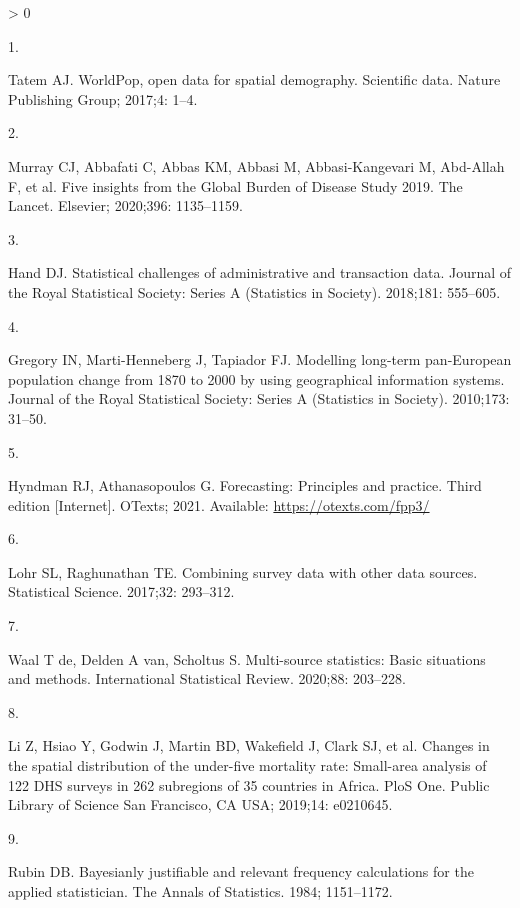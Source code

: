 \documentclass[10pt,letterpaper]{article}
\newlength{\csllabelwidth}
\newlength{\cslhangindent}
\newenvironment{CSLReferences}[2] %
 {%
  \setlength{\parindent}{0pt}
  \ifodd #1 \everypar{\setlength{\hangindent}{\cslhangindent}}\ignorespaces\fi
  \ifnum #2 > 0
  \setlength{\parskip}{#2\baselineskip}
  \fi
 }%
 {}
\newcommand{\CSLLeftMargin}[1]{\parbox[t]{\csllabelwidth}{#1}}
\newcommand{\CSLRightInline}[1]{\parbox[t]{\linewidth - \csllabelwidth}{#1}\break}
\begin{document}
\hypertarget{refs}{}
\begin{CSLReferences}{0}{0}
\leavevmode\hypertarget{ref-tatem2017worldpop}{}%
\CSLLeftMargin{1. }
\CSLRightInline{Tatem AJ. WorldPop, open data for spatial demography.
Scientific data. Nature Publishing Group; 2017;4: 1--4. }

\leavevmode\hypertarget{ref-murray2020five}{}%
\CSLLeftMargin{2. }
\CSLRightInline{Murray CJ, Abbafati C, Abbas KM, Abbasi M,
Abbasi-Kangevari M, Abd-Allah F, et al. Five insights from the {G}lobal
{B}urden of {D}isease {S}tudy 2019. The Lancet. Elsevier; 2020;396:
1135--1159. }

\leavevmode\hypertarget{ref-hand2018statistical}{}%
\CSLLeftMargin{3. }
\CSLRightInline{Hand DJ. Statistical challenges of administrative and
transaction data. Journal of the Royal Statistical Society: Series A
(Statistics in Society). 2018;181: 555--605. }

\leavevmode\hypertarget{ref-gregory2010modelling}{}%
\CSLLeftMargin{4. }
\CSLRightInline{Gregory IN, Marti-Henneberg J, Tapiador FJ. Modelling
long-term pan-{E}uropean population change from 1870 to 2000 by using
geographical information systems. Journal of the Royal Statistical
Society: Series A (Statistics in Society). 2010;173: 31--50. }

\leavevmode\hypertarget{ref-hyndman2021forecasting}{}%
\CSLLeftMargin{5. }
\CSLRightInline{Hyndman RJ, Athanasopoulos G. Forecasting: Principles
and practice. Third edition {[}Internet{]}. OTexts; 2021. Available:
\url{https://otexts.com/fpp3/}}

\leavevmode\hypertarget{ref-lohr2017combining}{}%
\CSLLeftMargin{6. }
\CSLRightInline{Lohr SL, Raghunathan TE. Combining survey data with
other data sources. Statistical Science. 2017;32: 293--312. }

\leavevmode\hypertarget{ref-de2020multi}{}%
\CSLLeftMargin{7. }
\CSLRightInline{Waal T de, Delden A van, Scholtus S. Multi-source
statistics: Basic situations and methods. International Statistical
Review. 2020;88: 203--228. }

\leavevmode\hypertarget{ref-li2019changes}{}%
\CSLLeftMargin{8. }
\CSLRightInline{Li Z, Hsiao Y, Godwin J, Martin BD, Wakefield J, Clark
SJ, et al. Changes in the spatial distribution of the under-five
mortality rate: Small-area analysis of 122 {DHS} surveys in 262
subregions of 35 countries in {A}frica. PloS One. Public Library of
Science San Francisco, CA USA; 2019;14: e0210645. }

\leavevmode\hypertarget{ref-rubin1984bayesianly}{}%
\CSLLeftMargin{9. }
\CSLRightInline{Rubin DB. Bayesianly justifiable and relevant frequency
calculations for the applied statistician. The Annals of Statistics.
1984; 1151--1172. }


\end{CSLReferences}
\end{document}
